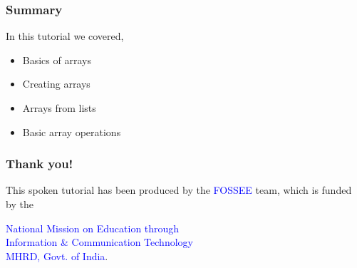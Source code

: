 \documentclass[presentation]{beamer}
\begin{document}
\begin{frame}
\frametitle{Summary}
\label{sec-14}

  In this tutorial we covered,
\begin{itemize}
\item Basics of arrays
\item Creating arrays
\item Arrays from lists
\item Basic array operations
\end{itemize}
\end{frame}
\begin{frame}
\frametitle{Thank you!}
\label{sec-15}

  \begin{block}{}
  \begin{center}
  This spoken tutorial has been produced by the
  \textcolor{blue}{FOSSEE} team, which is funded by the 
  \end{center}
  \begin{center}
    \textcolor{blue}{National Mission on Education through \\
      Information \& Communication Technology \\ 
      MHRD, Govt. of India}.
  \end{center}  
  \end{block}
\end{frame}
\end{document}
